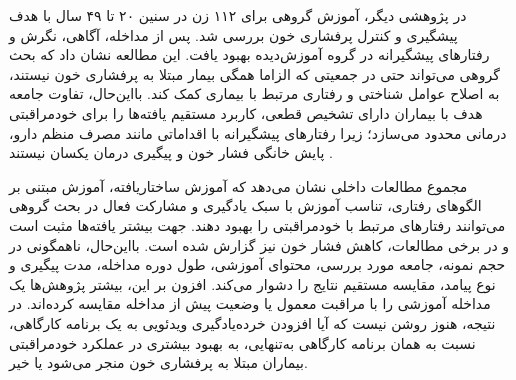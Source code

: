 \par
در پژوهشی دیگر، آموزش گروهی برای ۱۱۲ زن در سنین ۲۰ تا ۴۹ سال با هدف پیشگیری و کنترل پرفشاری خون بررسی شد. پس از مداخله، آگاهی، نگرش و رفتارهای پیشگیرانه در گروه آموزش‌دیده بهبود یافت. این مطالعه نشان داد که بحث گروهی می‌تواند حتی در جمعیتی که الزاما همگی بیمار مبتلا به پرفشاری خون نیستند، به اصلاح عوامل شناختی و رفتاری مرتبط با بیماری کمک کند. بااین‌حال، تفاوت جامعه هدف با بیماران دارای تشخیص قطعی، کاربرد مستقیم یافته‌ها را برای خودمراقبتی درمانی محدود می‌سازد؛ زیرا رفتارهای پیشگیرانه با اقداماتی مانند مصرف منظم دارو، پایش خانگی فشار خون و پیگیری درمان یکسان نیستند \cite{ramazankhani2017group}.
\par
مجموع مطالعات داخلی نشان می‌دهد که آموزش ساختاریافته، آموزش مبتنی بر الگوهای رفتاری، تناسب آموزش با سبک یادگیری و مشارکت فعال در بحث گروهی می‌توانند رفتارهای مرتبط با خودمراقبتی را بهبود دهند. جهت بیشتر یافته‌ها مثبت است و در برخی مطالعات، کاهش فشار خون نیز گزارش شده است. بااین‌حال، ناهمگونی در حجم نمونه، جامعه مورد بررسی، محتوای آموزشی، طول دوره مداخله، مدت پیگیری و نوع پیامد، مقایسه مستقیم نتایج را دشوار می‌کند. افزون بر این، بیشتر پژوهش‌ها یک مداخله آموزشی را با مراقبت معمول یا وضعیت پیش از مداخله مقایسه کرده‌اند. در نتیجه، هنوز روشن نیست که آیا افزودن خرده‌یادگیری ویدئویی به یک برنامه کارگاهی، نسبت به همان برنامه کارگاهی به‌تنهایی، به بهبود بیشتری در عملکرد خودمراقبتی بیماران مبتلا به پرفشاری خون منجر می‌شود یا خیر.

